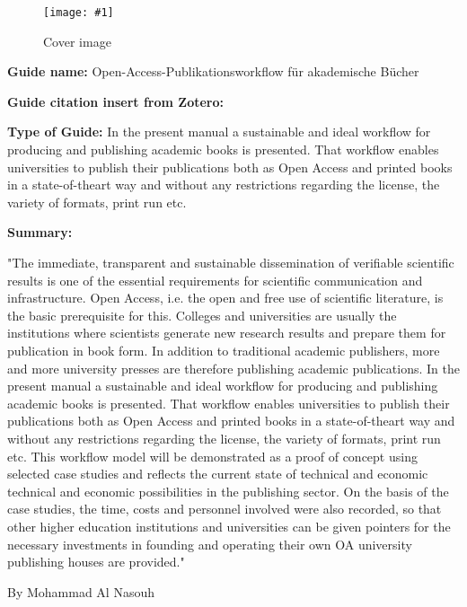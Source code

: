 \documentclass{article}
\newlength{\imgwidth}
\newcommand\scaledgraphics[2]{%
                
\settowidth{\imgwidth}{\texttt{[image: \#1]}}%
                
\setlength{\imgwidth}{\minof{\imgwidth}{#2\textwidth}}%
                
\texttt{[image: \#1]}%
                
}
\begin{document}
\begin{center}
\begin{figure}
\scaledgraphics{39363ae5-01d9-4e5a-a46f-bf20971df65a.jpg}{0.5}
\caption*{Cover image}\label{F7674061}
\end{figure}


\end{center}


\textbf{Guide name:}  Open-Access-Publikationsworkflow für akademische Bücher


\textbf{Guide citation insert from Zotero: }\autocite{bohm_open-access-publikationsworkflow_2020}


\textbf{Type of Guide: }In the present manual a sustainable and ideal workflow for producing and publishing academic books is presented. That workflow enables universities to publish their publications both as Open Access and printed books in a state-of-theart way and without any restrictions regarding the license, the variety of formats, print run etc.


\textbf{Summary: }


"The immediate, transparent and sustainable dissemination of verifiable scientific results is one of the essential requirements for scientific communication and infrastructure. Open Access, i.e. the open and free use of scientific literature, is the basic prerequisite for this. Colleges and universities are usually the institutions where scientists generate new research results and prepare them for publication in book form. In addition to traditional academic publishers, more and more university presses are therefore publishing academic publications. In the present manual a sustainable and ideal workflow for producing and publishing academic books is presented. That workflow enables universities to publish their publications both as Open Access and printed books in a state-of-theart way and without any restrictions regarding the license, the variety of formats, print run etc. This workflow model will be demonstrated as a proof of concept using selected case studies and reflects the current state of technical and economic technical and economic possibilities in the publishing sector. On the basis of the case studies, the time, costs and personnel involved were also recorded, so that other higher education institutions and universities can be given pointers for the necessary investments in founding and operating their own OA university publishing houses are provided."


By Mohammad Al Nasouh 


\printbibliography[title={Literaturverzeichnis}]
\end{document}
